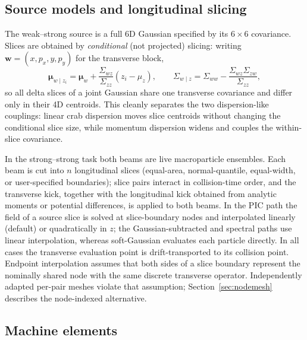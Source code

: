 \documentclass[a4paper,fleqn]{cas-sc}
\begin{document}
\subsection{Source models and longitudinal slicing}
\label{sec:slicing}

The weak--strong source is a full 6D Gaussian specified by its $6\times6$
covariance.  Slices are obtained by \emph{conditional} (not projected)
slicing: writing $\mathbf w=(x,p_x,y,p_y)$ for the transverse block,
\begin{equation}
  \boldsymbol\mu_{w\mid z_i}=\boldsymbol\mu_w+\frac{\Sigma_{wz}}{\Sigma_{zz}}(z_i-\mu_z),
  \qquad
  \Sigma_{w\mid z}=\Sigma_{ww}-\frac{\Sigma_{wz}\Sigma_{zw}}{\Sigma_{zz}},
  \label{eq:conditional}
\end{equation}
so all delta slices of a joint Gaussian share one transverse covariance and
differ only in their 4D centroids.  This cleanly separates the two
dispersion-like couplings: linear crab dispersion moves slice centroids
without changing the conditional slice size, while momentum dispersion widens
and couples the within-slice covariance.

In the strong--strong task both beams are live macroparticle ensembles.  Each
beam is cut into $n$ longitudinal slices (equal-area, normal-quantile,
equal-width, or user-specified boundaries); slice pairs interact in
collision-time order, and the transverse kick, together with the longitudinal
kick obtained from analytic moments or potential differences, is applied to
both beams.  In the PIC path the field of a source slice is solved at
slice-boundary nodes and interpolated linearly (default) or quadratically in
$z$; the Gaussian-subtracted and spectral paths use linear
interpolation, whereas soft-Gaussian evaluates each particle directly.  In
all cases the transverse evaluation point is drift-transported to its
collision point.  Endpoint interpolation assumes that both sides of a slice
boundary represent the nominally shared node with the same discrete
transverse operator.  Independently adapted per-pair meshes violate that
assumption; Section~\ref{sec:nodemesh} describes the node-indexed alternative.

\subsection{Machine elements}
\end{document}
